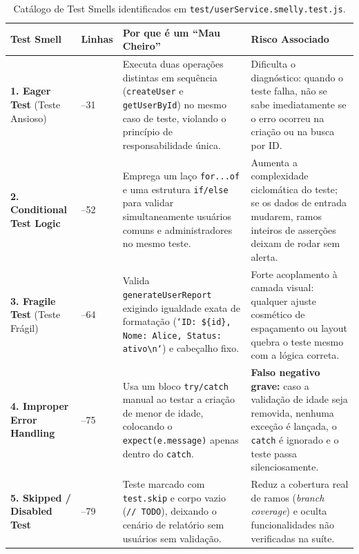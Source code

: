 \documentclass[11pt, a4paper]{article}
\begin{document}
\begin{table}[H]
\centering
\scriptsize
\caption{Catálogo de Test Smells identificados em \texttt{test/userService.smelly.test.js}.}
\label{tab:smells}
\begin{tabularx}{\textwidth}{>{\raggedright\arraybackslash}p{2.7cm} >{\raggedright\arraybackslash}p{1.2cm} >{\raggedright\arraybackslash}X >{\raggedright\arraybackslash}X}
\toprule
\textbf{Test Smell} & \textbf{Linhas} & \textbf{Por que é um ``Mau Cheiro''} & \textbf{Risco Associado} \\
\midrule
\textbf{1. Eager Test} (Teste Ansioso) & 18--31 & Executa duas operações distintas em sequência (\texttt{createUser} e \texttt{getUserById}) no mesmo caso de teste, violando o princípio de responsabilidade única. & Dificulta o diagnóstico: quando o teste falha, não se sabe imediatamente se o erro ocorreu na criação ou na busca por ID. \\
\addlinespace
\textbf{2. Conditional Test Logic} & 33--52 & Emprega um laço \texttt{for...of} e uma estrutura \texttt{if/else} para validar simultaneamente usuários comuns e administradores no mesmo teste. & Aumenta a complexidade ciclomática do teste; se os dados de entrada mudarem, ramos inteiros de asserções deixam de rodar sem alerta. \\
\addlinespace
\textbf{3. Fragile Test} (Teste Frágil) & 54--64 & Valida \texttt{generateUserReport} exigindo igualdade exata de formatação (\texttt{`ID: \$\{id\}, Nome: Alice, Status: ativo\textbackslash n`}) e cabeçalho fixo. & Forte acoplamento à camada visual: qualquer ajuste cosmético de espaçamento ou layout quebra o teste mesmo com a lógica correta. \\
\addlinespace
\textbf{4. Improper Error Handling} & 66--75 & Usa um bloco \texttt{try/catch} manual ao testar a criação de menor de idade, colocando o \texttt{expect(e.message)} apenas dentro do \texttt{catch}. & \textbf{Falso negativo grave:} caso a validação de idade seja removida, nenhuma exceção é lançada, o \texttt{catch} é ignorado e o teste passa silenciosamente. \\
\addlinespace
\textbf{5. Skipped / Disabled Test} & 77--79 & Teste marcado com \texttt{test.skip} e corpo vazio (\texttt{// TODO}), deixando o cenário de relatório sem usuários sem validação. & Reduz a cobertura real de ramos (\textit{branch coverage}) e oculta funcionalidades não verificadas na suíte. \\
\bottomrule
\end{tabularx}
\end{table}
\end{document}
